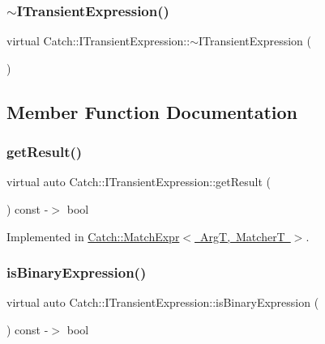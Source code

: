 \subsubsection{\texorpdfstring{$\sim$\+I\+Transient\+Expression()}{~ITransientExpression()}}
{\footnotesize\ttfamily virtual Catch\+::\+I\+Transient\+Expression\+::$\sim$\+I\+Transient\+Expression (\begin{DoxyParamCaption}{ }\end{DoxyParamCaption})\hspace{0.3cm}{\ttfamily [virtual]}}



\subsection{Member Function Documentation}
\mbox{\label{structCatch_1_1ITransientExpression_ade7e988c982fd6befc47c7154ca0ec6b}} 
\subsubsection{\texorpdfstring{get\+Result()}{getResult()}}
{\footnotesize\ttfamily virtual auto Catch\+::\+I\+Transient\+Expression\+::get\+Result (\begin{DoxyParamCaption}{ }\end{DoxyParamCaption}) const -\/$>$  bool\hspace{0.3cm}{\ttfamily [pure virtual]}}



Implemented in \mbox{\hyperlink{classCatch_1_1MatchExpr_a61faf50ec55387909a9ff8520ebd0818}{Catch\+::\+Match\+Expr$<$ Arg\+T, Matcher\+T $>$}}.

\mbox{\label{structCatch_1_1ITransientExpression_aa93e6bb9392c8c99c695ec9f0ef147dc}} 
\subsubsection{\texorpdfstring{is\+Binary\+Expression()}{isBinaryExpression()}}
{\footnotesize\ttfamily virtual auto Catch\+::\+I\+Transient\+Expression\+::is\+Binary\+Expression (\begin{DoxyParamCaption}{ }\end{DoxyParamCaption}) const -\/$>$  bool\hspace{0.3cm}{\ttfamily [pure virtual]}}



